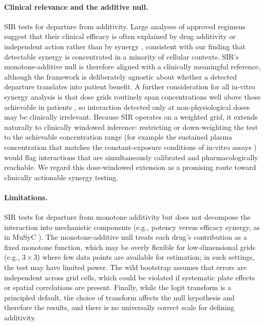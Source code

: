 \documentclass[unnumsec,webpdf,contemporary,large]{oup-authoring-template}
\begin{document}
\paragraph{Clinical relevance and the additive null.}
SIR tests for departure from additivity. Large analyses of approved regimens suggest that their clinical efficacy is often explained by drug additivity or independent action rather than by synergy \cite{PalmerSorger2017,LingHuang2020}, consistent with our finding that detectable synergy is concentrated in a minority of cellular contexts. SIR's monotone-additive null is therefore aligned with a clinically meaningful reference, although the framework is deliberately agnostic about whether a detected departure translates into patient benefit. A further consideration for all in-vitro synergy analysis is that dose grids routinely span concentrations well above those achievable in patients \cite{ListonDavis2017}, so interaction detected only at non-physiological doses may be clinically irrelevant. Because SIR operates on a weighted grid, it extends naturally to clinically windowed inference: restricting or down-weighting the test to the achievable concentration range (for example the sustained plasma concentration that matches the constant-exposure conditions of in-vitro assays \cite{LingHuang2020}) would flag interactions that are simultaneously calibrated and pharmacologically reachable. We regard this dose-windowed extension as a promising route toward clinically actionable synergy testing.

\paragraph{Limitations.}
SIR tests for departure from monotone additivity but does not decompose the interaction into mechanistic components (e.g., potency versus efficacy synergy, as in MuSyC \cite{MuSyC2021}).
The monotone-additive null treats each drug's contribution as a fixed monotone function, which may be overly flexible for low-dimensional grids (e.g., $3\times 3$) where few data points are available for estimation; in such settings, the test may have limited power.
The wild bootstrap assumes that errors are independent across grid cells, which could be violated if systematic plate effects or spatial correlations are present.
Finally, while the logit transform is a principled default, the choice of transform affects the null hypothesis and therefore the results, and there is no universally correct scale for defining additivity.
\end{document}
